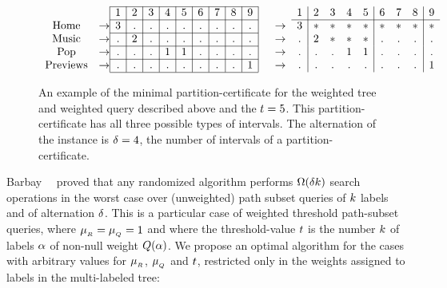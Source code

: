 \begin{figure}
  \centering
  $$  \begin{array}[b]{cc@{}|c|c|c|c|c|c|c|c|c|ccc|cccc|ccc|c} \cline{3-11}

    & 
&1       &2 & 3 &4                        &     5    &  6       &          7    &      8   &   9                 & & &
 1  &  2 &  3 &  4 &  5 &  6 &  7 & 8  &  9   %
\\ \cline{3-11} \cline{14-22}


    \mbox{Home}  & \rightarrow
& 3  & . & . & .                             & .       & .      & .           & .      & .                 & & \rightarrow &
  3  &  * &  * &  * &  * &  * &  * & *  &  * %
\\ \cline{3-11}
    \mbox{Music} & \rightarrow
    & .       & 2       & .            & .       & .      & . & . & . & .                                  & & \rightarrow &
  . & 2  &  * & *  &  * & .  &  . &  . & .  %
\\ \cline{3-11}
    \mbox{Pop}   & \rightarrow
         & .       & .       & .                                & 1      & 1   &.&.&.   & .             & & \rightarrow &
  . &  . & .  &  1 & 1  & .  & .  &  . &  . %
\\ \cline{3-11}
    \mbox{Previews} & \rightarrow
& .           &.&.& .                    & .       & .      & .           & .      & 1                 & & \rightarrow &
  .  &  . &  . &  . &  . &  . &  . & .  &  1 %
\\ \cline{3-11}
  \end{array}$$
    \caption{ An example of the minimal partition-certificate for the weighted tree and weighted query described above and the $\threshold = 5$.
      This partition-certificate has all three possible types of intervals.
      The alternation of the instance is $\difficulty=4$, the number of intervals of a partition-certificate.
      \label{fig:TreeCert} }
\end{figure}


Barbay~\etal~\cite{adaptiveSearchingInSuccinctlyEncodedBinaryRelationsAndTreeStructuredDocuments}
proved that any randomized algorithm performs
$\Omega(\delta k)$ search operations in the worst case
over (unweighted) path subset queries of $k$ labels and of
alternation $\delta$.
%
This is a particular case of weighted
threshold path-subset queries, where $\mu_{_{R}} = \mu_{_{Q}} = 1$ and
where the threshold-value $t$ is the number $k$ of labels $\alpha$
of non-null weight $Q(\alpha)$.
%
We propose an optimal algorithm for the cases with arbitrary values
for $\mu_{_{R}}$, $\mu_{_{Q}}$ and $t$, restricted only in
the weights assigned to labels in the multi-labeled tree:


